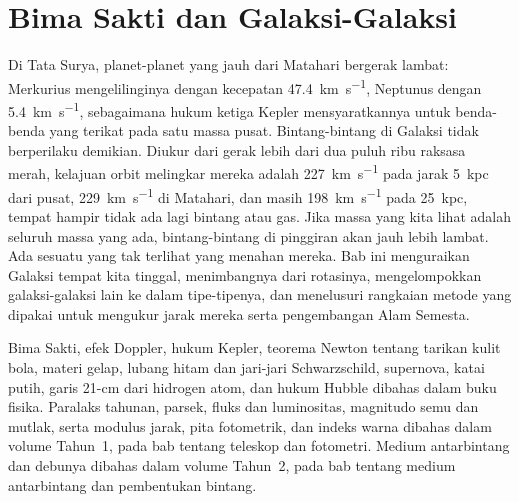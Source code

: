 \chapter{Bima Sakti dan Galaksi-Galaksi}\label{ch:b3:milky-way-galaxies}

Di Tata Surya, planet-planet yang jauh dari Matahari bergerak lambat: Merkurius
mengelilinginya dengan kecepatan \qty{47.4}{km.s^{-1}}, Neptunus dengan \qty{5.4}{km.s^{-1}}, sebagaimana
hukum ketiga Kepler mensyaratkannya untuk benda-benda yang terikat pada satu massa pusat. Bintang-bintang
di Galaksi tidak berperilaku demikian. Diukur dari gerak lebih dari
dua puluh ribu raksasa merah, kelajuan orbit melingkar mereka adalah
\qty{227}{km.s^{-1}} pada jarak \qty{5}{kpc} dari pusat, \qty{229}{km.s^{-1}}
di Matahari, dan masih \qty{198}{km.s^{-1}} pada \qty{25}{kpc}, tempat hampir
tidak ada lagi bintang atau gas. Jika massa yang kita lihat adalah seluruh massa yang ada, bintang-bintang
di pinggiran akan jauh lebih lambat. Ada sesuatu yang tak terlihat yang menahan mereka. Bab ini
menguraikan Galaksi tempat kita tinggal, menimbangnya dari rotasinya, mengelompokkan
galaksi-galaksi lain ke dalam tipe-tipenya, dan menelusuri rangkaian metode
yang dipakai untuk mengukur jarak mereka serta pengembangan Alam Semesta.

\begin{recall}
Bima Sakti, efek Doppler, hukum Kepler, teorema Newton tentang
tarikan kulit bola, materi gelap, lubang hitam dan
jari-jari Schwarzschild, supernova, katai putih, garis 21-cm dari
hidrogen atom, dan hukum Hubble dibahas dalam buku fisika. Paralaks tahunan,
parsek, fluks dan luminositas, magnitudo semu dan mutlak, serta
modulus jarak, pita fotometrik, dan indeks warna dibahas dalam
volume Tahun~1, pada bab tentang teleskop dan fotometri. Medium
antarbintang dan debunya dibahas dalam volume Tahun~2, pada bab tentang
medium antarbintang dan pembentukan bintang.
\end{recall}

